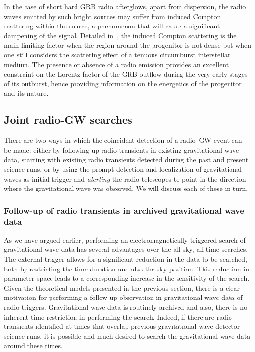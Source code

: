 In the case of short hard GRB radio afterglows, apart from dispersion, the radio waves emitted by such bright sources may suffer from induced Compton scattering within the source, a phenomenon that will cause a significant dampening of the signal. Detailed in~\cite{Macquart:2007kv}, the induced Compton scattering is the main limiting factor when the region around the progenitor is not dense but when one still considers the scattering effect of a tenuous circumburst interstellar medium. The presence or absence of a radio emission provides an excellent constraint on the Lorentz factor of the GRB outflow during the very early stages of its outburst, hence providing information on the energetics of the progenitor and its nature. 


\subsection{Joint radio-GW searches}
\label{sec:search}

There are two ways in which the coincident detection of a radio--GW
event can be made: either by following up radio transients in existing
gravitational wave data, starting with existing radio transients
detected during the past and present science runs, or by using the
prompt detection and localization of gravitational waves as initial
trigger and {\it alerting} the radio telescopes to point in the
direction where the gravitational wave was observed.  We will discuss
each of these in turn.


\subsubsection{Follow-up of radio transients in archived gravitational wave data}

As we have argued earlier, performing an electromagnetically triggered
search of gravitational wave data has several advantages over the all
sky, all time searches.  The external trigger allows for a significant
reduction in the data to be searched, both by restricting the time
duration and also the sky position.  This reduction in parameter space leads
to a corresponding increase in the sensitivity of the search.  Given the
theoretical models presented in the previous section, there is a clear
motivation for performing a follow-up observation in gravitational wave
data of radio triggers.  Gravitational wave data is routinely archived and also, 
there is no inherent time restriction in performing the search. Indeed, if there
are radio transients identified at times that overlap previous
gravitational wave detector science runs, it is possible and much desired to
search the gravitational wave data around these times.

